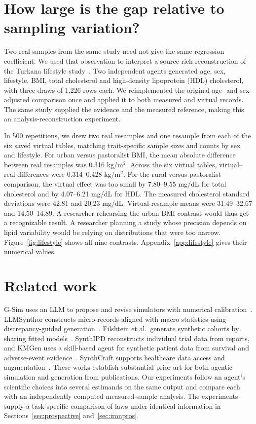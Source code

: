 \documentclass[sigconf,anonymous,review]{acmart}
\begin{document}
\section{How large is the gap relative to sampling variation?}
\label{sec:lifestyle}
Two real samples from the same study need not give the same regression coefficient. We used that observation to interpret a source-rich reconstruction of the Turkana lifestyle study~\cite{lea,leadata}. Two independent agents generated age, sex, lifestyle, BMI, total cholesterol and high-density lipoprotein (HDL) cholesterol, with three draws of 1,226 rows each. We reimplemented the original age- and sex-adjusted comparison once and applied it to both measured and virtual records. The same study supplied the evidence and the measured reference, making this an analysis-reconstruction experiment.

In 500 repetitions, we drew two real resamples and one resample from each of the six saved virtual tables, matching trait-specific sample sizes and counts by sex and lifestyle. For urban versus pastoralist BMI, the mean absolute difference between real resamples was 0.316 kg/m$^2$. Across the six virtual tables, virtual--real differences were 0.314--0.428 kg/m$^2$. For the rural versus pastoralist comparison, the virtual effect was too small by 7.80--9.55 mg/dL for total cholesterol and by 4.07--6.21 mg/dL for HDL. The measured cholesterol standard deviations were 42.81 and 20.23 mg/dL. Virtual-resample means were 31.49--32.67 and 14.50--14.89. A researcher rehearsing the urban BMI contrast would thus get a recognizable result. A researcher planning a study whose precision depends on lipid variability would be relying on distributions that were too narrow. Figure~\ref{fig:lifestyle} shows all nine contrasts. Appendix~\ref{app:lifestyle} gives their numerical values.


\section{Related work}
G-Sim uses an LLM to propose and revise simulators with numerical calibration~\cite{gsim}. LLMSynthor constructs micro-records aligned with macro statistics using discrepancy-guided generation~\cite{llmsynthor}. Filshtein et al.\ generate synthetic cohorts by sharing fitted models~\cite{filshtein}. SynthIPD reconstructs individual trial data from reports, and KMGen uses a skill-based agent for synthetic patient data from survival and adverse-event evidence~\cite{synthipd,kmgen}. SynthCraft supports healthcare data access and augmentation~\cite{synthcraft}. These works establish substantial prior art for both agentic simulation and generation from publications. Our experiments follow an agent's scientific choices into several estimands on the same output and compare each with an independently computed measured-sample analysis. The experiments supply a task-specific comparison of laws under identical information in Sections~\ref{sec:prospective} and~\ref{sec:ironpros}.
\end{document}
